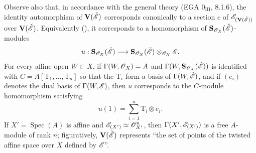 \begin{env}[18.5.1]
Observe also that, in accordance with the general theory (EGA $0_{\mathrm{III}}$, 8.1.6), the identity automorphism of $\mathbf{V}(\check{\mathscr{E}})$ corresponds canonically to a section $c$ of $\mathscr{E}_{(\mathbf{V}(\check{\mathscr{E}}))}$ over $\mathbf{V}(\check{\mathscr{E}})$.
Equivalently (), it corresponds to a homomorphism of $\mathbf{S}_{\mathscr{O}_X}(\check{\mathscr{E}})$-modules
\[
u:\mathbf{S}_{\mathscr{O}_X}(\check{\mathscr{E}})\longrightarrow
\mathbf{S}_{\mathscr{O}_X}(\check{\mathscr{E}})\otimes_{\mathscr{O}_X}\mathscr{E}.
\]
For every affine open $W\subset X$, if $\Gamma(W,\mathscr{O}_X)=A$ and $\Gamma(W,\mathbf{S}_{\mathscr{O}_X}(\check{\mathscr{E}}))$ is identified with $C=A[\mathrm{T}_1,\ldots,\mathrm{T}_n]$ so that the $\mathrm{T}_i$ form a basis of $\Gamma(W,\check{\mathscr{E}})$, and if $(e_i)$ denotes the dual basis of $\Gamma(W,\mathscr{E})$, then $u$ corresponds to the $C$-module homomorphism satisfying
\[
u(1)=\sum_{i=1}^n \mathrm{T}_i\otimes e_i.
\]
If $X'=\operatorname{Spec}(A)$ is affine and $\mathscr{E}_{(X')}\simeq\mathscr{O}_{X'}^n$, then $\Gamma(X',\mathscr{E}_{(X')})$ is a free $A$-module of rank $n$; figuratively, $\mathbf{V}(\check{\mathscr{E}})$ represents ``the set of points of the twisted affine space over $X$ defined by $\mathscr{E}$''.
\end{env}

